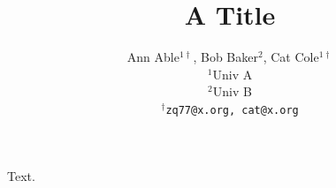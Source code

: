 \documentclass{article}
\begin{document}
\title{A Title}
\author{Ann Able$^{1\dagger}$, Bob Baker$^2$, Cat Cole$^{1\dagger}$ \\ $^1$Univ A \\ $^2$Univ B \\
$^\dagger$\texttt{zq77@x.org, cat@x.org}}
\maketitle
Text.
\end{document}
